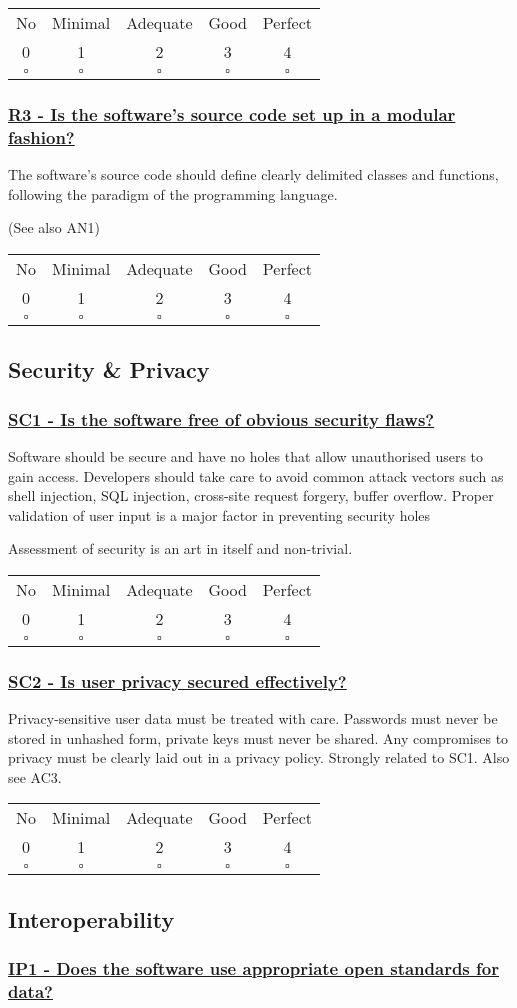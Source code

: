 \documentclass[a4paper,11pt]{article}
\newcommand{\criterion}[2]{\subsubsection*{\underline{#1 - #2}}\label{id:#1}}
\newcommand\CheckTable{%
  \begin{tabular}{ccccc}
    No & Minimal & Adequate & Good & Perfect \\
    0 & 1 & 2 & 3 & 4 \\
    \hline
    $\square$ & $\square$ & $\square$ & $\square$ & $\square$ \\
  \end{tabular}%
}
\begin{document}
\CheckTable

\newcommand{\rThreeID}{R3}
\newcommand{\rThreeText}{Is the software's source code set up in a modular fashion?}
\criterion{\rThreeID}{\rThreeText}
%
%
%

The software's source code should define clearly delimited classes and
functions, following the paradigm of the programming language. 

(See also AN1)

\CheckTable

\subsection{Security \& Privacy}\label{sec:sec}

\newcommand{\scOneID}{SC1}
\newcommand{\scOneText}{Is the software free of obvious security flaws?}
\criterion{\scOneID}{\scOneText}

Software should be secure and have no holes that allow unauthorised users to
gain access. Developers should take care to avoid common attack vectors such as
shell injection, SQL injection, cross-site request forgery, buffer overflow.
Proper validation of user input is a major factor in preventing security holes

Assessment of security is an art in itself and non-trivial. 

\CheckTable

\newcommand{\scTwoID}{SC2}
\newcommand{\scTwoText}{Is user privacy secured effectively?}
\criterion{\scTwoID}{\scTwoText}

Privacy-sensitive user data must be treated with care. Passwords must never be
stored in unhashed form, private keys must never be shared. Any compromises to
privacy must be clearly laid out in a privacy policy.  Strongly related to SC1.
Also see AC3.

\CheckTable

\subsection{Interoperability}\label{sec:int}

\newcommand{\ipOneID}{IP1}
\newcommand{\ipOneText}{Does the software use appropriate open standards for data?}
\criterion{\ipOneID}{\ipOneText}
\end{document}
